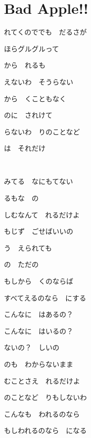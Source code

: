 \section{Bad Apple!!}

れてくのででも　だるさが

ほらグルグルって

から　れるも

えないわ　そうらない

から　くこともなく

のに　されけて

らないわ　りのことなど

は　それだけ

~

みてる　なにもてない

るもな　の

しむなんて　れるだけよ

もじず　ごせばいいの

う　えられても

の　ただの

もしから　くのならば

すべてえるのなら　にする

こんなに　はあるの？

こんなに　はいるの？

ないの？　しいの

のも　わからないまま

むことさえ　れるだけよ

のことなど　りもしないわ

こんなも　われるのなら

もしわれるのなら　になる

